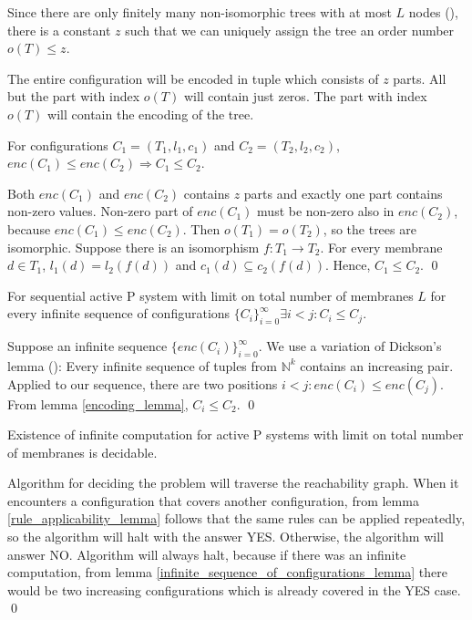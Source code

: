 Since there are only finitely many non-isomorphic trees with at most $L$ nodes (\cite{Cayley1881RootedTrees}), there is a constant $z$ such that we can uniquely assign the tree an order number $o(T) \leq z$.

The entire configuration will be encoded in tuple which consists of $z$ parts. All but the part with index $o(T)$ will contain just zeros. The part with index $o(T)$ will contain the encoding of the tree.

\begin{lemma}
\label{encoding_lemma}
  For configurations $C_1 = (T_1, l_1, c_1)$ and $C_2 = (T_2, l_2, c_2)$, $enc(C_1) \leq enc(C_2)\Rightarrow C_1\leq C_2$.
\end{lemma}

\begin{dokaz}
  Both $enc(C_1)$ and $enc(C_2)$ contains $z$ parts and exactly one part contains non-zero values. Non-zero part of $enc(C_1)$ must be non-zero also in $enc(C_2)$, because $enc(C_1)\leq enc(C_2)$. Then $o(T_1)=o(T_2)$, so the trees are isomorphic. Suppose there is an isomorphism $f:T_1\rightarrow T_2$. For every membrane $d\in T_1$, $l_1(d)=l_2(f(d))$ and $c_1(d)\subseteq c_2(f(d))$. Hence, $C_1\leq C_2$.
  \qed
\end{dokaz}

\begin{lemma}
\label{infinite_sequence_of_configurations_lemma}
  For sequential active P system with limit on total number of membranes $L$ for every infinite sequence of configurations $\{C_i\}_{i=0}^\infty\exists i<j: C_i\leq C_j$.
\end{lemma}

\begin{dokaz}
  Suppose an infinite sequence $\{enc(C_i)\}_{i=0}^\infty$. We use a variation of Dickson's lemma (\cite{Figueira11Dickson}): Every infinite sequence of tuples from $\mathbb N^k$ contains an increasing pair. Applied to our sequence, there are two positions $i<j: enc(C_i)\leq enc(C_j)$. From lemma \ref{encoding_lemma}, $C_i\leq C_2$.
  \qed
\end{dokaz}

\begin{veta}
  Existence of infinite computation for active P systems with limit on total number of membranes is decidable.
\end{veta}

\begin{dokaz}
  Algorithm for deciding the problem will traverse the reachability graph. When it encounters a configuration that covers another configuration, from lemma \ref{rule_applicability_lemma} follows that the same rules can be applied repeatedly, so the algorithm will halt with the answer YES.
  Otherwise, the algorithm will answer NO.
  Algorithm will always halt, because if there was an infinite computation, from lemma \ref{infinite_sequence_of_configurations_lemma} there would be two increasing configurations which is already covered in the YES case.
  \qed
\end{dokaz}

